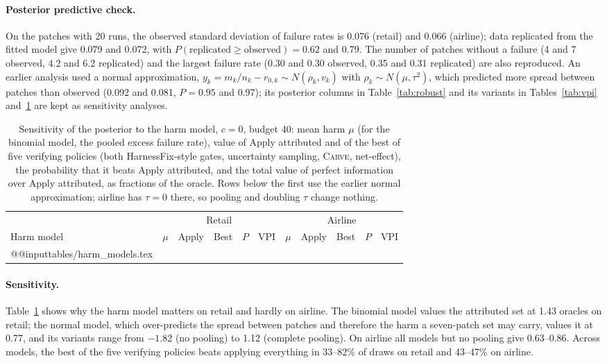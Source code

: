 \documentclass[11pt]{article}
\newcommand{\carve}{\textsc{Carve}}
\begin{document}
\paragraph{Posterior predictive check.} On the patches with 20 runs, the observed standard deviation of failure rates is 0.076 (retail) and 0.066 (airline); data replicated from the fitted model give 0.079 and 0.072, with $P(\text{replicated}\ge\text{observed})=0.62$ and 0.79. The number of patches without a failure (4 and 7 observed, 4.2 and 6.2 replicated) and the largest failure rate (0.30 and 0.30 observed, 0.35 and 0.31 replicated) are also reproduced. An earlier analysis used a normal approximation, $y_k=m_k/n_k-r_{0,k}\sim N(\rho_k,v_k)$ with $\rho_k\sim N(\mu,\tau^2)$, which predicted more spread between patches than observed (0.092 and 0.081, $P=0.95$ and 0.97); its posterior columns in Table~\ref{tab:robust} and its variants in Tables~\ref{tab:vpi} and~\ref{tab:harmmodels} are kept as sensitivity analyses.

\begin{table}[t]
\centering
\small
\begin{tabular}{lcccccccccc}
\toprule
 & \multicolumn{5}{c}{Retail} & \multicolumn{5}{c}{Airline} \\
\cmidrule(lr){2-6}\cmidrule(lr){7-11}
Harm model & $\mu$ & Apply & Best & $P$ & VPI & $\mu$ & Apply & Best & $P$ & VPI \\
\midrule
\csname @@input\endcsname tables/harm_models.tex
\bottomrule
\end{tabular}
\caption{Sensitivity of the posterior to the harm model, $c=0$, budget 40: mean harm $\mu$ (for the binomial model, the pooled excess failure rate), value of Apply attributed and of the best of five verifying policies (both HarnessFix-style gates, uncertainty sampling, \carve{}, net-effect), the probability that it beats Apply attributed, and the total value of perfect information over Apply attributed, as fractions of the oracle. Rows below the first use the earlier normal approximation; airline has $\tau=0$ there, so pooling and doubling $\tau$ change nothing.}
\label{tab:harmmodels}
\end{table}

\paragraph{Sensitivity.} Table~\ref{tab:harmmodels} shows why the harm model matters on retail and hardly on airline. The binomial model values the attributed set at 1.43 oracles on retail; the normal model, which over-predicts the spread between patches and therefore the harm a seven-patch set may carry, values it at 0.77, and its variants range from $-1.82$ (no pooling) to 1.12 (complete pooling). On airline all models but no pooling give 0.63--0.86. Across models, the best of the five verifying policies beats applying everything in 33--82\% of draws on retail and 43--47\% on airline.
\end{document}
